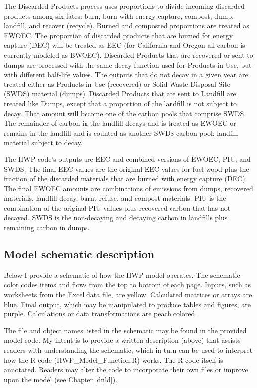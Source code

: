 \documentclass[
  openany]{book}
\begin{document}
The Discarded Products process uses proportions to divide incoming discarded products among six fates: burn, burn with energy capture, compost, dump, landfill, and recover (recycle). Burned and composted proportions are treated as EWOEC. The proportion of discarded products that are burned for energy capture (DEC) will be treated as EEC (for California and Oregon all carbon is currently modeled as BWOEC). Discarded Products that are recovered or sent to dumps are processed with the same decay function used for Products in Use, but with different half-life values. The outputs that do not decay in a given year are treated either as Products in Use (recovered) or Solid Waste Disposal Site (SWDS) material (dumps). Discarded Products that are sent to Landfill are treated like Dumps, except that a proportion of the landfill is not subject to decay. That amount will become one of the carbon pools that comprise SWDS. The remainder of carbon in the landfill decays and is treated as EWOEC or remains in the landfill and is counted as another SWDS carbon pool: landfill material subject to decay.

The HWP code's outputs are EEC and combined versions of EWOEC, PIU, and SWDS. The final EEC values are the original EEC values for fuel wood plus the fraction of the discarded materials that are burned with energy capture (DEC). The final EWOEC amounts are combinations of emissions from dumps, recovered materials, landfill decay, burnt refuse, and compost materials. PIU is the combination of the original PIU values plus recovered carbon that has not decayed. SWDS is the non-decaying and decaying carbon in landfills plus remaining carbon in dumps.

\hypertarget{model-func-schdesc}{%
\subsection{Model schematic description}\label{model-func-schdesc}}

Below I provide a schematic of how the HWP model operates. The schematic color codes items and flows from the top to bottom of each page. Inputs, such as worksheets from the Excel data file, are yellow. Calculated matrices or arrays are blue. Final output, which may be manipulated to produce tables and figures, are purple. Calculations or data transformations are peach colored.

The file and object names listed in the schematic may be found in the provided model code. My intent is to provide a written description (above) that assists readers with understanding the schematic, which in turn can be used to interpret how the R code (HWP\_Model\_Function.R) works. The R code itself is annotated. Readers may alter the code to incorporate their own files or improve upon the model (see Chapter \ref{dnld}).
\end{document}
